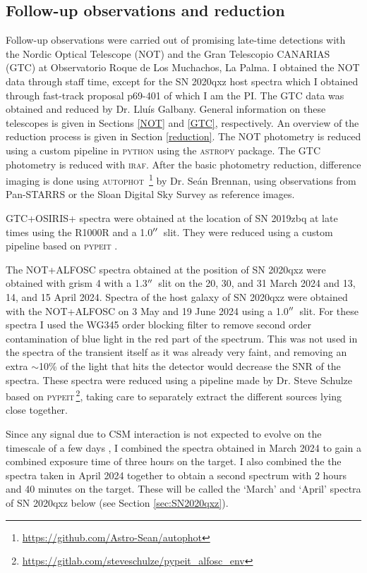 \documentclass[a4paper,oneside,12pt, class=Latex/Classes/PhDthesisPSnPDF, crop=false]{standalone}
\begin{document}
\subsection{Follow-up observations and reduction}
\label{sec:reduction}
Follow-up observations were carried out of promising late-time detections with the Nordic Optical Telescope (NOT) and the Gran Telescopio CANARIAS (GTC) at Observatorio Roque de Los Muchachos, La Palma. I obtained the NOT data through staff time, except for the SN 2020qxz host spectra which I obtained through fast-track proposal p69-401 of which I am the PI. The GTC data was obtained and reduced by Dr. Lluís Galbany. General information on these telescopes is given in Sections \ref{NOT} and \ref{GTC}, respectively. An overview of the reduction process is given in Section \ref{reduction}. The NOT photometry is reduced using a custom pipeline in \textsc{python} using the \textsc{astropy} package. The GTC photometry is reduced with \textsc{iraf}. After the basic photometry reduction, difference imaging is done using \textsc{autophot} \cite{Autophot}\,\footnote{\url{https://github.com/Astro-Sean/autophot}} by Dr. Seán Brennan, using observations from Pan-STARRS \citep{Pan-STARRS1} or the Sloan Digital Sky Survey \citep[SDSS, ][]{SDSS-I-II, SDSS_DR4, SDSS_telescope} as reference images. 

GTC+OSIRIS+ spectra were obtained at the location of SN 2019zbq at late times using the R1000R and a 1.0$^{\prime\prime}$\ slit. They were reduced using a custom pipeline based on \textsc{pypeit} \citep{pypeit:joss_pub, pypeit:zenodo}.

The NOT+ALFOSC spectra obtained at the position of SN 2020qxz were obtained with grism 4 with a 1.3$^{\prime\prime}$\ slit on the 20, 30, and 31 March 2024 and 13, 14, and 15 April 2024. Spectra of the host galaxy of SN 2020qxz were obtained with the NOT+ALFOSC on 3 May and 19 June 2024 using a 1.0$^{\prime\prime}$\ slit. For these spectra I used the WG345 order blocking filter to remove second order contamination of blue light in the red part of the spectrum. This was not used in the spectra of the transient itself as it was already very faint, and removing an extra $\sim$10\% of the light that hits the detector would decrease the SNR of the spectra. These spectra were reduced using a pipeline made by Dr. Steve Schulze based on \textsc{pypeit}\,\footnote{\url{https://gitlab.com/steveschulze/pypeit_alfosc_env}}, taking care to separately extract the different sources lying close together.

Since any signal due to CSM interaction is not expected to evolve on the timescale of a few days \citep[e.g.,][]{2015cp}, I combined the spectra  obtained in March 2024 to gain a combined exposure time of three hours on the target. I also combined the the spectra taken in April 2024 together to obtain a second spectrum with 2 hours and 40 minutes on the target. These will be called the `March' and `April' spectra of SN 2020qxz below (see Section \ref{sec:SN2020qxz}).
\end{document}
